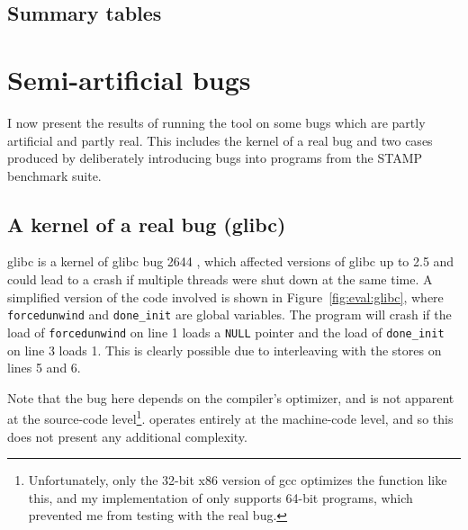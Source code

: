 \subsection{Summary tables}


\section{Semi-artificial bugs}
\label{sect:eval:semiartificial}

I now present the results of running the tool on some bugs which are
partly artificial and partly real.  This includes the kernel of a real
bug and two cases produced by deliberately introducing bugs into
programs from the STAMP benchmark suite\needCite{}.

\subsection{A kernel of a real bug (glibc)}
\label{sect:eval:glibc}

glibc is a kernel of glibc bug 2644 \cite{glibc2644}, which affected
versions of glibc up to 2.5 and could lead to a crash if multiple
threads were shut down at the same time.  A simplified version of the
code involved is shown in Figure~\ref{fig:eval:glibc}, where
\texttt{forcedunwind} and \texttt{done\_init} are global variables.
The program will crash if the load of \texttt{forcedunwind} on line 1
loads a \texttt{NULL} pointer and the load of \texttt{done\_init} on
line 3 loads 1.  This is clearly possible due to interleaving with the
stores on lines 5 and 6.

Note that the bug here depends on the compiler's optimizer, and is not
apparent at the source-code level\footnote{Unfortunately, only the
  32-bit x86 version of gcc optimizes the function like this, and my
  implementation of {\technique} only supports 64-bit programs, which
  prevented me from testing with the real bug.}.  {\Technique}
operates entirely at the machine-code level, and so this does not
present any additional complexity.

